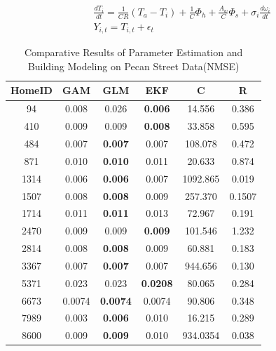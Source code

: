  \begin{eqnarray}
 \frac{dT_i}{dt} = \frac{1}{C  R} (T_a-T_i) + \frac{1}{C}\Phi_h + \frac{A_w}{C} \Phi_s + \sigma_i \frac{d\omega_i}{dt}\\
 Y_{i,t} = T_{i,t} + \epsilon_t
\end{eqnarray}  

 \begin{table}[t]
  \scriptsize
 \begin{tabular}{||c| c | c | c | c | c ||} 
 \hline 
 HomeID &  GAM & GLM & EKF & C & R  \\ [0.5ex] 
  \hline \hline
94 & 0.008  & 0.026  & \textbf{0.006 } &  14.556 &
 0.386 \\ \hline 
410 &  0.009 & 0.009  & \textbf{0.008} &  33.858 &
 0.595 \\ \hline
484 & 0.007 & \textbf{0.007} & 0.007 &  108.078 &
 0.472\\ \hline
871 & 0.010  & \textbf{0.010 } &  0.011 & 20.633 &
0.874\\ \hline
1314 & 0.006   & \textbf{0.006 } & 0.007 & 1092.865 &
0.019\\ \hline
1507 & 0.008  & \textbf{0.008 } & 0.009 & 257.370
& 0.1507 \\ \hline
1714 &  0.011  & \textbf{ 0.011 } & 0.013 &  72.967 & 
 0.191\\ \hline 
2470 & 0.009  & 0.009  &  \textbf{0.009} & 101.546&
1.232\\ \hline 
2814 & 0.008 & \textbf{0.008} & 0.009&  60.881&
 0.183\\ \hline
3367 & 0.007 & \textbf{0.007} & 0.007 & 944.656
& 0.130\\ \hline
5371 & 0.023 & 0.023 & \textbf{0.0208} &  80.065 & 
 0.284\\ \hline
6673 & 0.0074 & \textbf{0.0074} &  0.0074 &90.806
&0.348\\ \hline
7989 & 0.003 & \textbf{0.006} & 0.010 &16.215
&0.289\\ \hline
8600 & 0.009 & \textbf{0.009} & 0.010 &934.0354
&0.038\\ \hline
 \hline
\end{tabular}
 \label{Table:Par1}
\caption{Comparative Results of Parameter Estimation and Building Modeling on Pecan Street Data(NMSE)}
\end{table}
  

